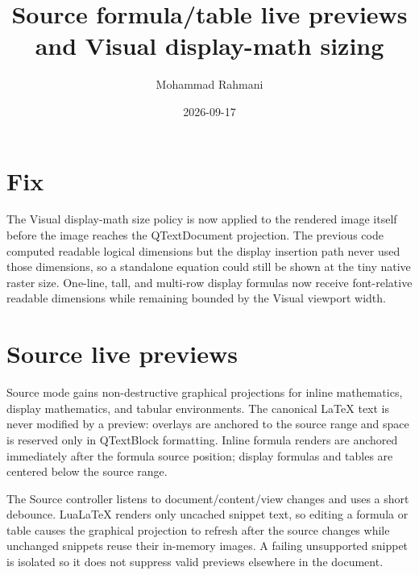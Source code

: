 \documentclass[a4paper]{article}
\title{Source formula/table live previews and Visual display-math sizing}
\date{2026-09-17}
\author{Mohammad Rahmani}
\begin{document}
\maketitle

\section{Fix}
The Visual display-math size policy is now applied to the rendered image itself
before the image reaches the QTextDocument projection.  The previous code
computed readable logical dimensions but the display insertion path never used
those dimensions, so a standalone equation could still be shown at the tiny
native raster size.  One-line, tall, and multi-row display formulas now receive
font-relative readable dimensions while remaining bounded by the Visual
viewport width.

\section{Source live previews}
Source mode gains non-destructive graphical projections for inline mathematics,
display mathematics, and tabular environments.  The canonical LaTeX text is
never modified by a preview: overlays are anchored to the source range and
space is reserved only in QTextBlock formatting.  Inline formula renders are
anchored immediately after the formula source position; display formulas and
tables are centered below the source range.

The Source controller listens to document/content/view changes and uses a short
debounce.  LuaLaTeX renders only uncached snippet text, so editing a formula or
table causes the graphical projection to refresh after the source changes while
unchanged snippets reuse their in-memory images.  A failing unsupported snippet
is isolated so it does not suppress valid previews elsewhere in the document.
\end{document}
